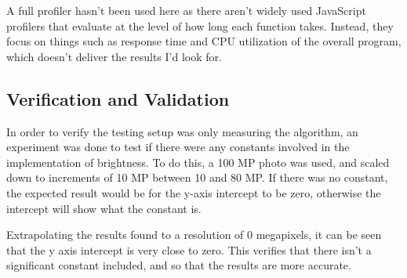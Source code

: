 \documentclass[12pt,a4paper]{article}
\begin{document}
A full profiler hasn't been used here as there aren't widely used JavaScript profilers that evaluate at the level of how long each function takes. Instead, they focus on things such as response time and CPU utilization of the overall program, which doesn't deliver the results I'd look for.

\subsection{Verification and Validation}

In order to verify the testing setup was only measuring the algorithm, an experiment was done to test if there were any constants involved in the implementation of brightness. To do this, a 100 MP photo was used, and scaled down to increments of 10 MP between 10 and 80 MP. If there was no constant, the expected result would be for the y-axis intercept to be zero, otherwise the intercept will show what the constant is.

\begin{figure}[H]
    \centering

\end{figure}

Extrapolating the results found to a resolution of 0 megapixels, it can be seen that the y axis intercept is very close to zero. This verifies that there isn't a significant constant included, and so that the results are more accurate.
\end{document}
